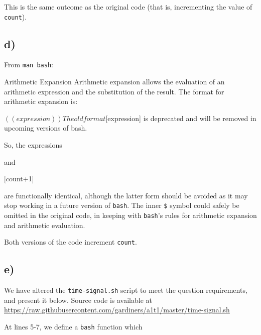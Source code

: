 \documentclass{article}
\begin{document}
This is the same outcome as the original code (that is, incrementing the value of \texttt{count}).

\subsection{d)}

From \texttt{man bash}:

\begin{bashinline}
Arithmetic Expansion
    Arithmetic expansion allows the evaluation of an arithmetic expression and the substitution of the result.  The format for arithmetic expansion is:

        $((expression))

    The old format $[expression] is deprecated and will be removed in upcoming versions of bash.
\end{bashinline}

So, the expressions


and

\begin{bashcode}
$[$count+1]
\end{bashcode}

are functionally identical, although the latter form should be avoided as it may stop working in a future version of \texttt{bash}. The inner \texttt{\$} symbol could safely be omitted in the original code, in keeping with \texttt{bash}'s rules for arithmetic expansion and arithmetic evaluation.

Both versions of the code increment \texttt{count}.

\subsection{e)}

We have altered the \texttt{time-signal.sh} script to meet the question requirements, and present it below. Source code is available at \url{https://raw.githubusercontent.com/gardiners/a1t1/master/time-signal.sh}


At lines 5-7, we define a \texttt{bash} function which 
\end{document}
